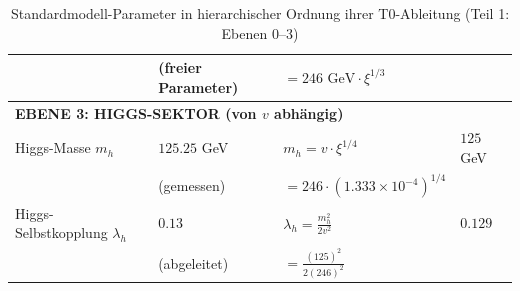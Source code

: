 \begin{table}[htbp]
{\begin{tabular}{p{5cm}p{3cm}p{2.7cm}p{2.7cm}}
			& (freier Parameter) & $= 246 \text{ GeV} \cdot \xi^{1/3}$ & \\[0.3em]
			\midrule
			\multicolumn{4}{l}{\textbf{EBENE 3: HIGGS-SEKTOR (von $v$ abhängig)}} \\
			\midrule
			Higgs-Masse $m_h$ & $125.25$ GeV & $m_h = v \cdot \xi^{1/4}$ & $125$ GeV \\
			& (gemessen) & $= 246 \cdot (1.333 \times 10^{-4})^{1/4}$ & \\[0.3em]
			Higgs-Selbstkopplung $\lambda_h$ & $0.13$ & $\lambda_h = \frac{m_h^2}{2v^2}$ & $0.129$ \\
			& (abgeleitet) & $= \frac{(125)^2}{2(246)^2}$ & \\[0.3em]
			\bottomrule
		\end{tabular}%
	}
	\caption{Standardmodell-Parameter in hierarchischer Ordnung ihrer T0-Ableitung (Teil 1: Ebenen 0--3)}
	\label{tab:sm-params-1}
\end{table}
